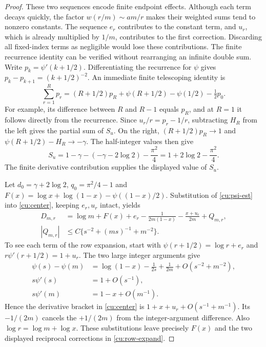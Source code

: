 \begin{proof}
These two sequences encode finite endpoint effects. Although each
term decays quickly, the factor $w(r/m)\sim am/r$ makes their
weighted sums tend to nonzero constants. The sequence $e_r$
contributes to the constant term, and $u_r$, which is already
multiplied by $1/m$, contributes to the first correction. Discarding
all fixed-index terms as negligible would lose these contributions.
The finite recurrence identity can be verified without rearranging
an infinite double sum. Write $p_k=\psi'(k+1/2)$. Differentiating
the recurrence for $\psi$ gives
$p_k-p_{k+1}=(k+1/2)^{-2}$. An immediate finite telescoping identity is
\[
 \sum_{r=1}^R p_r
 =(R+1/2)p_R+\psi(R+1/2)
       -\psi(1/2)-\tfrac12p_0.
\]
For example, its difference between $R$ and $R-1$ equals $p_R$,
and at $R=1$ it follows directly from the recurrence.
Since $u_r/r=p_r-1/r$, subtracting $H_R$ from the left gives
the partial sum of $S_u$. On the right,
$(R+1/2)p_R\to1$ and
$\psi(R+1/2)-H_R\to-\gamma$. The half-integer values then give
\[
 S_u=1-\gamma-(-\gamma-2\log2)-\frac{\pi^2}{4}
       =1+2\log2-\frac{\pi^2}{4}.
\]
The finite derivative contribution supplies the displayed value of $S_u$.

Let $d_0=\gamma+2\log2$, $q_0=\pi^2/4-1$ and
$F(x)=\log x+\log(1-x)-\psi((1-x)/2)$. Substitution of
\eqref{cu:psi-est} into \eqref{cu:center}, keeping $e_r,u_r$ intact, yields
\begin{equation}\label{cu:row-expand}
 \begin{aligned}
 D_{m,r}&=\log m+F(x)+e_r-\frac1{2m(1-x)}
                 -\frac{x+u_r}{2m}+Q_{m,r},\\
 |Q_{m,r}|&\leq C\{s^{-2}+(ms)^{-1}+m^{-2}\}.
 \end{aligned}
\end{equation}
To see each term of the row expansion, start with
$\psi(r+1/2)=\log r+e_r$ and
$r\psi'(r+1/2)=1+u_r$. The two large integer arguments give
\[
 \begin{aligned}
 \psi(s)-\psi(m)
   &=\log(1-x)-\frac1{2s}+\frac1{2m}
                         +O(s^{-2}+m^{-2}),\\
 s\psi'(s)&=1+O(s^{-1}),\\
 s\psi'(m)&=1-x+O(m^{-1}).
 \end{aligned}
\]
Hence the derivative bracket in \eqref{cu:center} is
$1+x+u_r+O(s^{-1}+m^{-1})$. Its $-1/(2m)$ cancels the
$+1/(2m)$ from the integer-argument difference. Also
$\log r=\log m+\log x$. These substitutions leave precisely
$F(x)$ and the two displayed reciprocal corrections in
\eqref{cu:row-expand}.


\end{proof}
